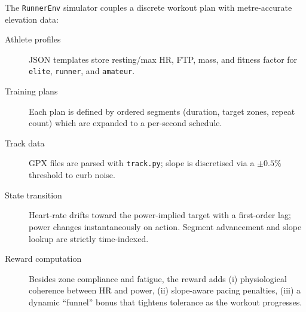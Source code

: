 The \texttt{RunnerEnv} simulator couples a discrete workout plan with metre-accurate elevation data:

\begin{description}
  \item[Athlete profiles] JSON templates store resting/max HR, FTP, mass, and fitness factor for \texttt{elite}, \texttt{runner}, and \texttt{amateur}.
  \item[Training plans] Each plan is defined by ordered segments (duration, target zones, repeat count) which are expanded to a per-second schedule.
  \item[Track data] GPX files are parsed with \texttt{track.py}; slope is discretised via a $\pm0.5\%$ threshold to curb noise.
  \item[State transition] Heart-rate drifts toward the power-implied target with a first-order lag; power changes instantaneously on action.  Segment advancement and slope lookup are strictly time-indexed.
  \item[Reward computation] Besides zone compliance and fatigue, the reward adds (i) physiological coherence between HR and power, (ii) slope-aware pacing penalties, (iii) a dynamic “funnel” bonus that tightens tolerance as the workout progresses.
\end{description}
